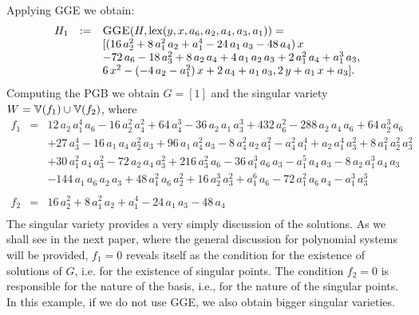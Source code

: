 Applying {\sc GGE} we obtain:
\[
\begin{array}{lll}
H_1 &:=& \hbox{\sc GGE}(H,\hbox{lex}(y,x,a_6,a_2,a_4,a_3,a_1))=
\\ && [(16\,a_2^2+8\,a_1^2\,a_2+a_1^4-24\,a_1\,a_3-48\,a_4)\,x \\
&&-72\,a_6-18\,a_3^2+8\,a_2\,a_4+4\,a_1\,a_2\,a_3+2\,a_1^2\,a_4+a_1^3\,a_3,\\
&& 6\,x^2-(-4\,a_2-a_1^2)\,x+2\,a_4+a_1\,a_3,2\,y+a_1\,x+a_3]. \\
\end{array}
\]
Computing the {\sc PGB} we obtain $G=[1]$ and the singular variety
$W={\mathbb{V}}(f_1) \cup {\mathbb{V}}(f_2)$, where
\[
\begin{array}{lcl}
f_1&=&12\,a_2\,a_1^4\,a_6-16\,a_2^2\,a_4^2+64\,a_4^3-36\,a_2\,a_1\,a_3^3+432\,a_6^2-288\,a_2\,a_4\,a_6+64\,a_2^3\,a_6\\
&&+27\,a_3^4-16\,a_1\,a_4\,a_2^2\,a_3+96\,a_1\,a_4^2\,a_3-8\,a_4^2\,a_2\,a_1^2-a_4^2\,a_1^4+a_2\,a_1^4\,a_3^2+8\,a_1^2\,a_2^2\,a_3^2\\
&&+30\,a_1^2\,a_4\,a_3^2-72\,a_2\,a_4\,a_3^2+216\,a_3^2\,a_6-36\,a_1^3\,a_6\,a_3-a_1^5\,a_4\,a_3-8\,a_2\,a_1^3\,a_4\,a_3\\
&&-144\,a_1\,a_6\,a_2\,a_3+48\,a_1^2\,a_6\,a_2^2+16\,a_2^3\,a_3^2+a_1^6\,a_6-72\,a_1^2\,a_6\,a_4-a_1^3\,a_3^3\\
\\
f_2&=&16\,a_2^2+8\,a_1^2\,a_2+a_1^4-24\,a_1\,a_3-48\,a_4\\
\end{array}
\]
The singular variety provides a very simply discussion of the
solutions. As we shall see in the next paper, where the general
discussion for polynomial systems will be provided, $f_1=0$
reveals itself as the condition for the existence of solutions of
$G$, i.e. for the existence of singular points. The condition
$f_2=0$ is responsible for the nature of the \Gr basis, i.e., for
the nature of the singular points. In this example, if we do not
use {\sc GGE}, we also obtain bigger singular varieties.


